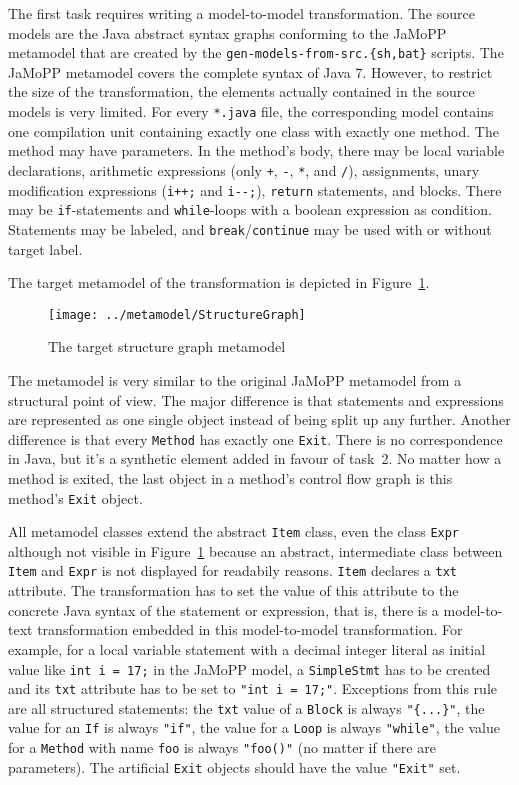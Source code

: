 \documentclass[submission,copyright,creativecommons]{eptcs}
\begin{document}
The first task requires writing a model-to-model transformation.  The source
models are the Java abstract syntax graphs conforming to the JaMoPP metamodel
that are created by the \verb$gen-models-from-src.{sh,bat}$ scripts.  The
JaMoPP metamodel covers the complete syntax of Java 7.  However, to restrict
the size of the transformation, the elements actually contained in the source
models is very limited.  For every \verb|*.java| file, the corresponding model
contains one compilation unit containing exactly one class with exactly one
method.  The method may have parameters.  In the method's body, there may be
local variable declarations, arithmetic expressions (only \verb|+|, \verb|-|,
\verb|*|, and \verb|/|), assignments, unary modification expressions
(\verb|i++;| and \verb|i--;|), \verb|return| statements, and blocks.  There may
be \verb|if|-statements and \verb|while|-loops with a boolean expression as
condition.  Statements may be labeled, and \verb|break|/\verb|continue| may be
used with or without target label.

The target metamodel of the transformation is depicted in
Figure~\ref{fig:structure-graph-mm}.

\begin{figure}[h!]
  \centering
  \texttt{[image: ../metamodel/StructureGraph]}
  \caption{The target structure graph metamodel}
  \label{fig:structure-graph-mm}
\end{figure}

The metamodel is very similar to the original JaMoPP metamodel from a
structural point of view.  The major difference is that statements and
expressions are represented as one single object instead of being split up any
further.  Another difference is that every \verb|Method| has exactly one
\verb|Exit|.  There is no correspondence in Java, but it's a synthetic element
added in favour of task~2.  No matter how a method is exited, the last object
in a method's control flow graph is this method's \verb|Exit| object.

All metamodel classes extend the abstract \verb|Item| class, even the class
\verb|Expr| although not visible in Figure~\ref{fig:structure-graph-mm} because
an abstract, intermediate class between \verb|Item| and \verb|Expr| is not
displayed for readabily reasons.  \verb|Item| declares a \verb|txt| attribute.
The transformation has to set the value of this attribute to the concrete Java
syntax of the statement or expression, that is, there is a model-to-text
transformation embedded in this model-to-model transformation.  For example,
for a local variable statement with a decimal integer literal as initial value
like \verb|int i = 17;| in the JaMoPP model, a \verb|SimpleStmt| has to be
created and its \verb|txt| attribute has to be set to \verb|"int i = 17;"|.
Exceptions from this rule are all structured statements: the \verb|txt| value
of a \verb|Block| is always \verb|"{...}"|, the value for an \verb|If| is
always \verb|"if"|, the value for a \verb|Loop| is always \verb|"while"|, the
value for a \verb|Method| with name \verb|foo| is always \verb|"foo()"| (no
matter if there are parameters).  The artificial \verb|Exit| objects should
have the value \verb|"Exit"| set.
\end{document}
